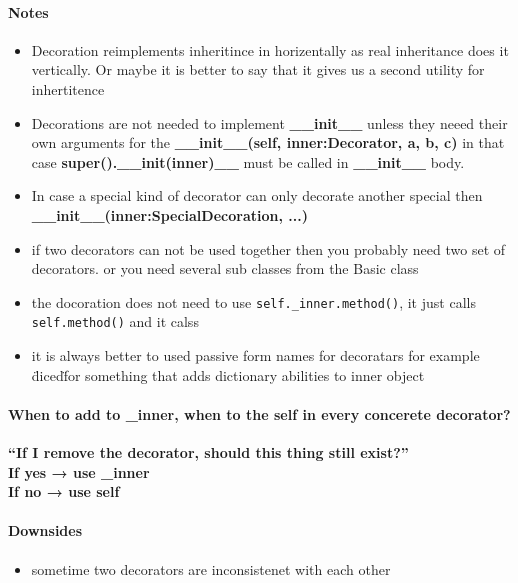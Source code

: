         \paragraph{Notes}
            \begin{itemize}
                    \item Decoration reimplements inheritince in horizentally as real inheritance does it vertically. Or maybe it is better to say that it gives us a second utility for inhertitence
                    \item Decorations are not needed to implement \textbf{\_\_init\_\_} unless they neeed their own arguments for the \textbf{\_\_init\_\_(self, inner:Decorator, a, b, c)} in that case \textbf{super().\_\_init(inner)\_\_} must be called in \textbf{\_\_init\_\_} body.
                    \item In case a special kind of decorator can only decorate another special then \textbf{\_\_init\_\_(inner:SpecialDecoration, ...)}
                    \item if two decorators can not be used together then you probably need two set of decorators. or you need several sub classes from the Basic class
                    \item the docoration does not need to use \texttt{self.\_inner.method()}, it just calls \texttt{self.method()} and it calss
                    \item  it is always better to used passive form names for decoratars for example \"diced\" for something that adds dictionary abilities to inner object
            \end{itemize}
        
        \paragraph{When to add to \_inner, when to the self in every concerete decorator?}
            \textbf{“If I remove the decorator, should this thing still exist?”
            \\
            If yes → use \_inner
            \\
            If no → use self
            }
        
        \paragraph{Downsides}
            \begin{itemize}
                    \item sometime two decorators are inconsistenet with each other
            \end{itemize}
        
